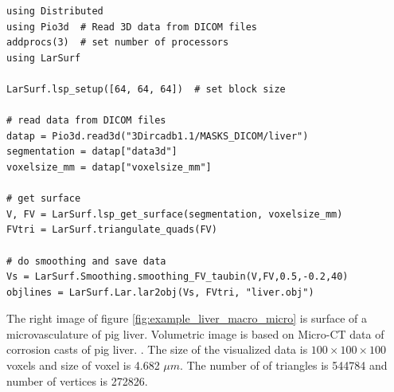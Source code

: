 \begin{lstlisting}[caption={Get surface from DICOM volumetric data}, label={lst:example1}]
using Distributed
using Pio3d  # Read 3D data from DICOM files
addprocs(3)  # set number of processors
using LarSurf

LarSurf.lsp_setup([64, 64, 64])  # set block size

# read data from DICOM files
datap = Pio3d.read3d("3Dircadb1.1/MASKS_DICOM/liver")
segmentation = datap["data3d"]
voxelsize_mm = datap["voxelsize_mm"]

# get surface
V, FV = LarSurf.lsp_get_surface(segmentation, voxelsize_mm)
FVtri = LarSurf.triangulate_quads(FV)

# do smoothing and save data
Vs = LarSurf.Smoothing.smoothing_FV_taubin(V,FV,0.5,-0.2,40)
objlines = LarSurf.Lar.lar2obj(Vs, FVtri, "liver.obj")
\end{lstlisting}

The right image of figure \ref{fig:example_liver_macro_micro} is surface of a microvasculature of pig liver. 
Volumetric image is based on Micro-CT data of corrosion casts of pig liver.
\cite{eberlova2017use}.
The size of the visualized data is $100\times100\times100$ voxels and size of voxel is 4.682 $\mu{}m$.
The number of of triangles is 
544784 and number of vertices is 272826.








